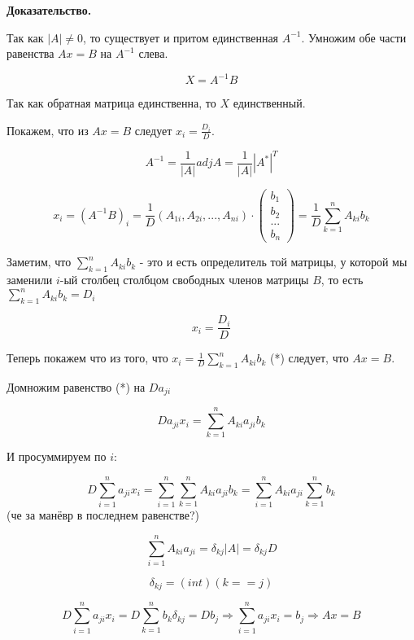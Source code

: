 \documentclass[a4paper]{article}
\begin{document}
\begin{hproof}\textbf{Доказательство.}

Так как $|A| \neq 0$, то существует и притом единственная $A^{-1}$. Умножим обе части равенства $Ax = B$ на $A^{-1}$ слева.

\[ X = A^{-1}B \]

Так как обратная матрица единственна, то $X$ единственный.

Покажем, что из $Ax = B$ следует $x_i = \frac{D_i}{D}$.

\[ A^{-1} = \frac{1}{|A|} adj A = \frac{1}{|A|} |A^*|^T \]

\[ x_i = (A^{-1}B)_i = \frac{1}{D} (A_{1i}, A_{2i}, ..., A_{ni}) \cdot \begin{pmatrix}
b_1 \\ b_2 \\ ... \\ b_n
\end{pmatrix} = \frac{1}{D} \sum_{k=1}^n A_{ki} b_k \]

Заметим, что $\sum_{k=1}^n A_{ki} b_k$ - это и есть определитель той матрицы, у которой мы заменили $i$-ый столбец столбцом свободных членов матрицы $B$, то есть $\sum_{k=1}^n A_{ki} b_k = D_i$

\[ x_i = \frac{D_i}{D} \]

Теперь покажем что из того, что $x_i = \frac{1}{D} \sum_{k=1}^n A_{ki} b_k$ (*) следует, что $Ax=B$.

Домножим равенство (*) на $Da_{ji}$

\[ D a_{ji} x_i = \sum_{k=1}^n A_{ki} a_{ji} b_k \]

И просуммируем по $i$:

\[ D \sum_{i=1}^n a_{ji} x_i = \sum_{i=1}^n  \sum_{k=1}^n A_{ki} a_{ji} b_k  = \sum_{i=1}^n A_{ki} a_{ji}  \sum_{k=1}^n b_k \] (че за манёвр в последнем равенстве?)

\[ \sum_{i=1}^n A_{ki} a_{ji} = \delta_{kj} |A| = \delta_{kj} D \]

\[ \delta_{kj} = (int)(k==j) \]

\[D \sum_{i=1}^n a_{ji} x_i = D \sum_{k=1}^n b_k \delta_{kj} = Db_j \Rightarrow \sum_{i=1}^n a_{ji}x_i = b_j \Rightarrow Ax=B \]
\end{hproof}
\end{document}
